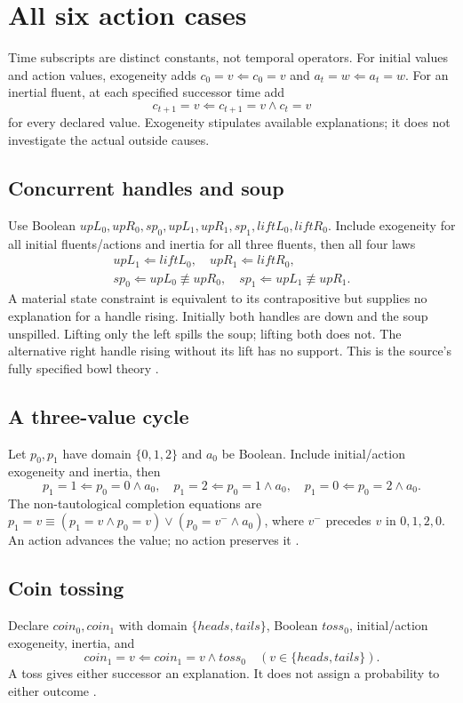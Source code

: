 \section{All six action cases}
\label{sec:p16-nct-action-cases}

Time subscripts are distinct constants, not temporal operators.
For initial values and action values, exogeneity adds
\(c_0=v\Leftarrow c_0=v\) and \(a_t=w\Leftarrow a_t=w\).
For an inertial fluent, at each specified successor time add
\[
                    c_{t+1}=v\Leftarrow c_{t+1}=v\land c_t=v
\]
for every declared value. Exogeneity stipulates available explanations;
it does not investigate the actual outside causes.

\subsection{Concurrent handles and soup}
Use Boolean \(upL_0,upR_0,sp_0,upL_1,upR_1,sp_1,liftL_0,liftR_0\).
Include exogeneity for all initial fluents/actions and inertia for all three
fluents, then all four laws
\[
\begin{gathered}
 upL_1\Leftarrow liftL_0,\quad upR_1\Leftarrow liftR_0,\\
 sp_0\Leftarrow upL_0\not\equiv upR_0,\quad
 sp_1\Leftarrow upL_1\not\equiv upR_1.
\end{gathered}
\]
A material state constraint is equivalent to its contrapositive but supplies
no explanation for a handle rising. Initially both handles are down and the
soup unspilled. Lifting only the left spills the soup; lifting both does not.
The alternative right handle rising without its lift has no support.
This is the source's fully specified bowl theory
\cite[pp.~760--764]{Turner2008NonmonotonicCausalLogic}.

\subsection{A three-value cycle}
Let \(p_0,p_1\) have domain \(\{0,1,2\}\) and \(a_0\) be Boolean.
Include initial/action exogeneity and inertia, then
\[
 p_1=1\Leftarrow p_0=0\land a_0,\quad
 p_1=2\Leftarrow p_0=1\land a_0,\quad
 p_1=0\Leftarrow p_0=2\land a_0.
\]
The non-tautological completion equations are
\(p_1=v\equiv(p_1=v\land p_0=v)\lor(p_0=v^{-}\land a_0)\),
where \(v^{-}\) precedes \(v\) in \(0,1,2,0\).
An action advances the value; no action preserves it
\cite[pp.~767,770]{Turner2008NonmonotonicCausalLogic}.

\subsection{Coin tossing}
Declare \(coin_0,coin_1\) with domain \(\{heads,tails\}\), Boolean \(toss_0\),
initial/action exogeneity, inertia, and
\[
              coin_1=v\Leftarrow coin_1=v\land toss_0
                              \quad(v\in\{heads,tails\}).
\]
A toss gives either successor an explanation. It does not assign a
probability to either outcome \cite[p.~768]{Turner2008NonmonotonicCausalLogic}.

